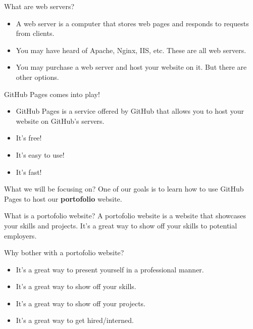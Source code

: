 \documentclass{beamer}
\begin{document}
\begin{frame}{What are web servers?}
    \begin{itemize}
        \item A web server is a computer that stores web pages and responds to requests from clients.
        \item You may have heard of Apache, Nginx, IIS, etc. These are all web servers.
        \item You may purchase a web server and host your website on it. But there are other options.
    \end{itemize}
\end{frame}

\begin{frame}{GitHub Pages comes into play!}
    \begin{itemize}
        \item GitHub Pages is a service offered by GitHub that allows you to host your website on GitHub's servers.
        \item It's free!
        \item It's easy to use!
        \item It's fast!
    \end{itemize}
\end{frame}

\begin{frame}{What we will be focusing on?}
    One of our goals is to learn how to use GitHub Pages to host our \textbf{portofolio} website. 
\end{frame}

\begin{frame}{What is a portofolio website?}
    A portofolio website is a website that showcases your skills and projects. It's a great way to show off your skills to potential employers.
\end{frame}

\begin{frame}{Why bother with a portofolio website?}
    \begin{itemize}
        \item It's a great way to present yourself in a professional manner.
        \item It's a great way to show off your skills.
        \item It's a great way to show off your projects.
        \item It's a great way to get hired/interned.
    \end{itemize}
\end{frame}
\end{document}
